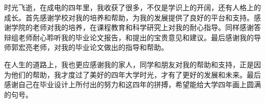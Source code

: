 \documentclass{standalone}
\begin{document}
\thesisacknowledgement
时光飞逝，在成电的四年里，我收获了很多，不仅是学识上的开阔，还有人格上的成长。首先感谢学校对我的培养和帮助，为我的发展提供了良好的平台和支持。感谢学院的老师对我的培养，在课程教育和科学研究上对我的耐心指导。同样感谢答辩组老师耐心聆听我的毕业论文报告，和提出的宝贵意见和建议。最后感谢我的导师郭宏亮老师，对我的毕业论文做出的指导和帮助。\par
在人生的道路上，我也更应感谢我的家人，同学和朋友对我的帮助和支持，正是因为他们的帮助，我才度过了美好的四年大学时光，才有了更好的发展和未来。最后感谢自己在毕业设计上所付出的努力和这四年的拼搏，希望能给大学四年画上圆满的句号。
\end{document}
